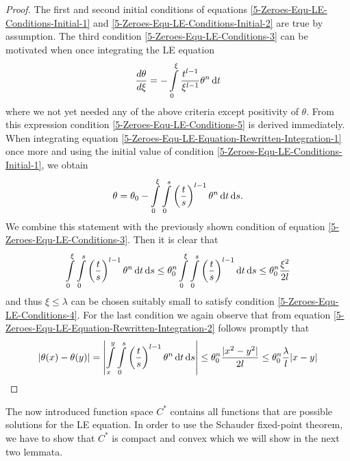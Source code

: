 \begin{proof}
	The first and second initial conditions of equations \eqref{5-Zeroes-Equ-LE-Conditions-Initial-1} and \eqref{5-Zeroes-Equ-LE-Conditions-Initial-2} are true by assumption.
	The third condition \eqref{5-Zeroes-Equ-LE-Conditions-3} can be motivated when once integrating the \ac{LE} equation
	\begin{equation}
		\frac{d\theta}{d\xi} = -\int\limits_0^\xi \frac{t^{l-1}}{\xi^{l-1}}\theta^n \mathop{}\!\mathrm{d} t
		\label{5-Zeroes-Equ-LE-Equation-Rewritten-Integration-1}
	\end{equation}
	where we not yet needed any of the above criteria except positivity of $\theta$.
	From this expression condition \eqref{5-Zeroes-Equ-LE-Conditions-5} is derived immediately.
	When integrating equation \eqref{5-Zeroes-Equ-LE-Equation-Rewritten-Integration-1} once more and using the initial value of condition \eqref{5-Zeroes-Equ-LE-Conditions-Initial-1}, we obtain
	\begin{equation}
		\theta = \theta_0 -\int\limits_0^\xi\int\limits_0^s \left(\frac{t}{s}\right)^{l-1}\theta^n \mathop{}\!\mathrm{d} t \mathop{}\!\mathrm{d} s.
		\label{5-Zeroes-Equ-LE-Equation-Rewritten-Integration-2}
	\end{equation}
	We combine this statement with the previously shown condition of equation \eqref{5-Zeroes-Equ-LE-Conditions-3}.
	Then it is clear that
	\begin{equation}
		\int\limits_0^\xi\int\limits_0^s \left(\frac{t}{s}\right)^{l-1}\theta^n \mathop{}\!\mathrm{d} t \mathop{}\!\mathrm{d} s \leq \theta_0^n\int\limits_0^\xi\int\limits_0^s \left(\frac{t}{s}\right)^{l-1} \mathop{}\!\mathrm{d} t \mathop{}\!\mathrm{d} s \leq \theta_0^n\frac{\xi^2}{2l}
		\label{5-Zeroes-Equ-LE-Equation-Rewritten-Inequality}
	\end{equation}
	and thus $\xi\leq\lambda$ can be chosen suitably small to satisfy condition \eqref{5-Zeroes-Equ-LE-Conditions-4}.
	For the last condition we again observe that from equation \eqref{5-Zeroes-Equ-LE-Equation-Rewritten-Integration-2} follows promptly that
	\begin{equation}
		|\theta(x)-\theta(y)| = \left|\int\limits_x^y\int\limits_0^s \left(\frac{t}{s}\right)^{l-1}\theta^n \mathop{}\!\mathrm{d} t \mathop{}\!\mathrm{d} s\right| \leq \theta^n_0\frac{|x^2-y^2|}{2l} \leq \theta^n_0\frac{\lambda}{l}|x-y|
		\label{5-Zeroes-Equ-LE-Equation-Rewritten-Inequality-2}
	\end{equation}
\end{proof}\noindent
The now introduced function space $C^*$ contains all functions that are possible solutions for the \ac{LE} equation.
In order to use the Schauder fixed-point theorem, we have to show that $C^*$ is compact and convex which we will show in the next two lemmata.
